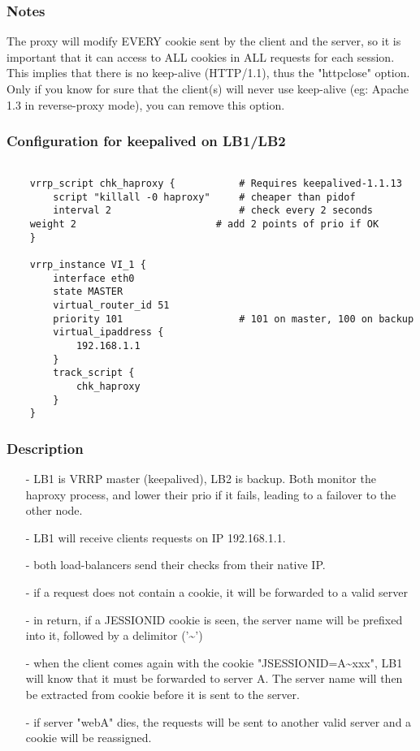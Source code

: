 \subsubsection{Notes}

The proxy will modify EVERY cookie sent by the client and the server,
so it is important that it can access to ALL cookies in ALL requests for
each session. This implies that there is no keep-alive (HTTP/1.1), thus the
"httpclose" option. Only if you know for sure that the client(s) will never
use keep-alive (eg: Apache 1.3 in reverse-proxy mode), you can remove this
option.

\subsubsection{Configuration for keepalived on LB1/LB2}

\begin{verbatim}

    vrrp_script chk_haproxy {           # Requires keepalived-1.1.13
        script "killall -0 haproxy"     # cheaper than pidof
        interval 2                      # check every 2 seconds
	weight 2                        # add 2 points of prio if OK
    }

    vrrp_instance VI_1 {
        interface eth0
        state MASTER
        virtual_router_id 51
        priority 101                    # 101 on master, 100 on backup
        virtual_ipaddress {
            192.168.1.1
        }
        track_script {
            chk_haproxy
        }
    }
\end{verbatim}

\subsubsection{Description}

\begin{itemize}
\item[-] LB1 is VRRP master (keepalived), LB2 is backup. Both monitor the haproxy
   process, and lower their prio if it fails, leading to a failover to the
   other node.
\item[-] LB1 will receive clients requests on IP 192.168.1.1.
\item[-] both load-balancers send their checks from their native IP.
\item[-] if a request does not contain a cookie, it will be forwarded to a valid
   server
\item[-] in return, if a JESSIONID cookie is seen, the server name will be prefixed
   into it, followed by a delimitor ('\~{}')
\item[-] when the client comes again with the cookie "JSESSIONID=A\~{}xxx", LB1 will
   know that it must be forwarded to server A. The server name will then be
   extracted from cookie before it is sent to the server.
\item[-] if server "webA" dies, the requests will be sent to another valid server
   and a cookie will be reassigned.
\end{itemize}

